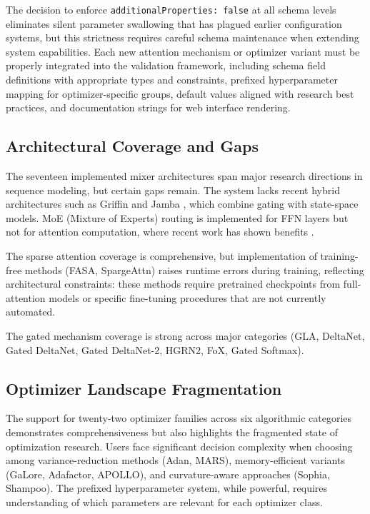 \documentclass[11pt,a4paper]{article}
\begin{document}
The decision to enforce \texttt{additionalProperties: false} at all schema levels eliminates silent parameter swallowing that has plagued earlier configuration systems, but this strictness requires careful schema maintenance when extending system capabilities. Each new attention mechanism or optimizer variant must be properly integrated into the validation framework, including schema field definitions with appropriate types and constraints, prefixed hyperparameter mapping for optimizer-specific groups, default values aligned with research best practices, and documentation strings for web interface rendering.

\subsection{Architectural Coverage and Gaps}

The seventeen implemented mixer architectures span major research directions in sequence modeling, but certain gaps remain. The system lacks recent hybrid architectures such as Griffin \citep{soares_griffin_2024} and Jamba \citep{gu_jamba_2024}, which combine gating with state-space models. MoE (Mixture of Experts) routing is implemented for FFN layers but not for attention computation, where recent work has shown benefits \citep{lewis_moe_2021}.

The sparse attention coverage is comprehensive, but implementation of training-free methods (FASA, SpargeAttn) raises runtime errors during training, reflecting architectural constraints: these methods require pretrained checkpoints from full-attention models or specific fine-tuning procedures that are not currently automated.

The gated mechanism coverage is strong across major categories (GLA, DeltaNet, Gated DeltaNet, Gated DeltaNet-2, HGRN2, FoX, Gated Softmax).

\subsection{Optimizer Landscape Fragmentation}

The support for twenty-two optimizer families across six algorithmic categories demonstrates comprehensiveness but also highlights the fragmented state of optimization research. Users face significant decision complexity when choosing among variance-reduction methods (Adan, MARS), memory-efficient variants (GaLore, Adafactor, APOLLO), and curvature-aware approaches (Sophia, Shampoo). The prefixed hyperparameter system, while powerful, requires understanding of which parameters are relevant for each optimizer class.
\end{document}
